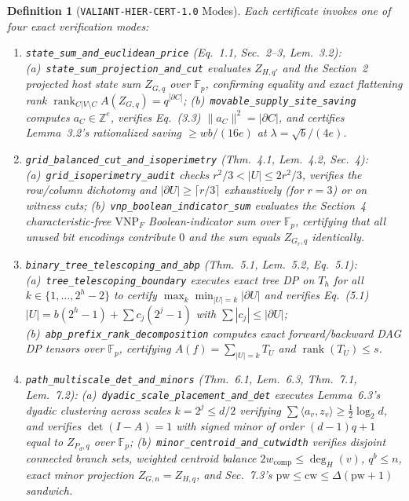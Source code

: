 \documentclass[10pt,twocolumn]{article}
\newtheorem{definition}{Definition}
\begin{document}
{\begin{definition}[\texttt{VALIANT-HIER-CERT-1.0} Modes]
Each certificate invokes one of four exact verification modes:
\begin{enumerate}[leftmargin=*,itemsep=1.5pt,topsep=2pt]
\item \texttt{state\_sum\_and\_\allowbreak euclidean\_price} (Eq.~1.1, Sec.~2--3, Lem.~3.2): (a)~\texttt{state\_sum\_projection\_and\_cut} evaluates $Z_{H,q'}$ and the Section~2 projected host state sum $Z_{G,q}$ over $\mathbb{F}_p$, confirming equality and exact flattening rank $\operatorname{rank}_{C|V\setminus C} A(Z_{G,q}) = q^{|\partial C|}$; (b)~\texttt{movable\_supply\_site\_saving} computes $a_C\in\mathbb{Z}^e$, verifies Eq.~(3.3) $\|a_C\|^2=|\partial C|$, and certifies Lemma~3.2's rationalized saving $\ge wb/(16e)$ at $\lambda=\sqrt{b}/(4e)$.
\item \texttt{grid\_balanced\_cut\_and\_\allowbreak isoperimetry} (Thm.~4.1, Lem.~4.2, Sec.~4): (a)~\texttt{grid\_isoperimetry\_audit} checks $r^2/3<|U|\le 2r^2/3$, verifies the row/column dichotomy and $|\partial U|\ge\lceil r/3\rceil$ exhaustively (for $r=3$) or on witness cuts; (b)~\texttt{vnp\_boolean\_indicator\_sum} evaluates the Section~4 characteristic-free $\mathrm{VNP}_F$ Boolean-indicator sum over $\mathbb{F}_p$, certifying that all unused bit encodings contribute $0$ and the sum equals $Z_{G_r,q}$ identically.
\item \texttt{binary\_tree\_telescoping\_and\_\allowbreak abp} (Thm.~5.1, Lem.~5.2, Eq.~5.1): (a)~\texttt{tree\_telescoping\_boundary} executes exact tree DP on $T_h$ for all $k\in\{1,\dots,2^h-2\}$ to certify $\max_k\min_{|U|=k}|\partial U|$ and verifies Eq.~(5.1) $|U|=b(2^h-1)+\sum c_j(2^j-1)$ with $\sum|c_j|\le|\partial U|$; (b)~\texttt{abp\_prefix\_rank\_decomposition} computes exact forward/backward DAG DP tensors over $\mathbb{F}_p$, certifying $A(f)=\sum_{|U|=k} T_U$ and $\operatorname{rank}(T_U)\le s$.
\item \texttt{path\_multiscale\_det\_and\_\allowbreak minors} (Thm.~6.1, Lem.~6.3, Thm.~7.1, Lem.~7.2): (a)~\texttt{dyadic\_scale\_placement\_and\_det} executes Lemma~6.3's dyadic clustering across scales $k=2^j\le d/2$ verifying $\sum\langle a_v,z_v\rangle \ge \frac{1}{2}\log_2 d$, and verifies $\det(I-A)=1$ with signed minor of order $(d-1)q+1$ equal to $Z_{P_d,q}$ over $\mathbb{F}_p$; (b)~\texttt{minor\_centroid\_and\_cutwidth} verifies disjoint connected branch sets, weighted centroid balance $2w_{\mathrm{comp}}\le \deg_H(v)$, $q^b\le n$, exact minor projection $Z_{G,n}=Z_{H,q}$, and Sec.~7.3's $\mathrm{pw}\le\mathrm{cw}\le\Delta(\mathrm{pw}+1)$ sandwich.
\end{enumerate}
\end{definition}

}
\end{document}

